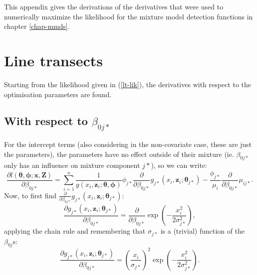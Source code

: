 \label{app-mixderivs}

This appendix gives the derivations of the derivatives that were used to numerically maximize the likelihood for the mixture model detection functions in chapter \ref{chap-mmds}.

\section{Line transects}

Starting from the likelihood given in (\ref{lt-lik}), the derivatives with respect to the optimisation parameters are found.

\subsection{With respect to $\beta_{0j*}$}
For the intercept terms (also considering in the non-covariate case, these are just the parameters), the parameters have no effect outside of their mixture (ie. $\beta_{0j*}$ only has an influence on mixture component $j*$), so we can write:
\begin{equation*}
\frac{\partial l\left (\bm{\theta},\bm{\phi}; \mathbf{x},\mathbf{Z}\right )}{\partial \beta_{0j*}} = \sum_{i=1}^n \frac{1}{g\left (x_i,\mathbf{z}_i; \bm{\theta},\bm{\phi}\right )} \phi_{j*} \frac{\partial}{\partial \beta_{0j*}} g_{j*}\left (x_i,\mathbf{z}_i; \bm{\theta}_{j*}\right )  - \frac{\phi_{j*}}{\mu_i}  \frac{\partial}{\partial \beta_{0j*}} \mu_{ij*}.
\end{equation*}
Now, to first find\label{cor-e11} $\frac{\partial}{\partial \beta_{0j*}} g_{j*}\left (x_i,\mathbf{z}_i; \bm{\theta}_{j*}\right )$:
\begin{equation*}
\frac{\partial g_{j*}\left (x_i,\mathbf{z}_i; \bm{\theta}_{j*}\right )}{\partial \beta_{0j*}} = \frac{\partial}{\partial \beta_{0j*}} \exp\left ( -\frac{x_i^2}{2\sigma_{j*}^2} \right ),
\end{equation*}
applying the chain rule and remembering that $\sigma_{j*}$ is a (trivial) function of the $\beta_{0j}$s:
\begin{equation*}
\frac{\partial g_{j*}\left (x_i,\mathbf{z}_i; \bm{\theta}_{j*} \right )}{\partial \beta_{0j*}} = \left ( \frac{x_i}{\sigma_{j*}}\right )^2 \exp \left (-\frac{x_i^2}{2 \sigma_{j*}^2}\right ).
\end{equation*}


